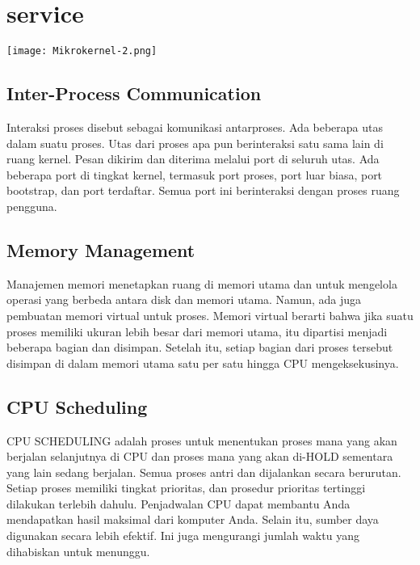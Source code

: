 \section{service}
\texttt{[image: Mikrokernel-2.png]}


\subsection*{Inter-Process Communication}

Interaksi proses disebut sebagai komunikasi antarproses. Ada beberapa utas dalam suatu proses. Utas dari proses apa pun berinteraksi satu sama lain di ruang kernel. Pesan dikirim dan diterima melalui port di seluruh utas. Ada beberapa port di tingkat kernel, termasuk port proses, port luar biasa, port bootstrap, dan port terdaftar. Semua port ini berinteraksi dengan proses ruang pengguna.

\subsection*{Memory Management}

Manajemen memori menetapkan ruang di memori utama dan untuk mengelola operasi yang berbeda antara disk dan memori utama. Namun, ada juga pembuatan memori virtual untuk proses. Memori virtual berarti bahwa jika suatu proses memiliki ukuran lebih besar dari memori utama, itu dipartisi menjadi beberapa bagian dan disimpan. Setelah itu, setiap bagian dari proses tersebut disimpan di dalam memori utama satu per satu hingga CPU mengeksekusinya.

\subsection*{CPU Scheduling}

CPU SCHEDULING adalah proses untuk menentukan proses mana yang akan berjalan selanjutnya di CPU dan proses mana yang akan di-HOLD sementara yang lain sedang berjalan. Semua proses antri dan dijalankan secara berurutan. Setiap proses memiliki tingkat prioritas, dan prosedur prioritas tertinggi dilakukan terlebih dahulu. Penjadwalan CPU dapat membantu Anda mendapatkan hasil maksimal dari komputer Anda. Selain itu, sumber daya digunakan secara lebih efektif. Ini juga mengurangi jumlah waktu yang dihabiskan untuk menunggu.

\vskip0.5cm

